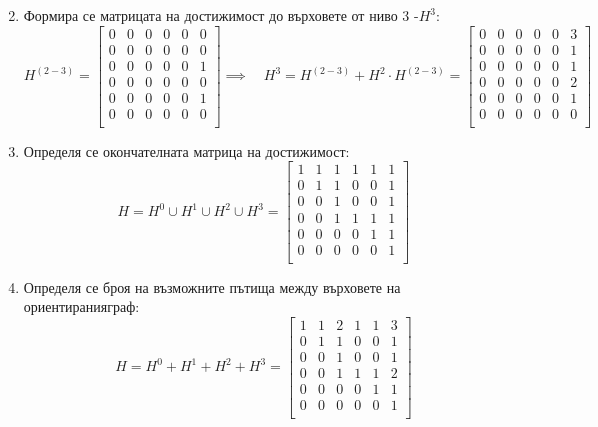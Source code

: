 \documentclass[fleqn, 12pt]{article}
\theoremstyle{definition}
\begin{document}
\begin{enumerate}
$$$$
\item Формира се матрицата на достижимост до върховете от ниво 3 -$H^3$:
$$
H^{(2-3)} = 
\begin{bmatrix}
0 & 0 & 0 & 0 & 0 & 0 \\
0 & 0 & 0 & 0 & 0 & 0 \\
0 & 0 & 0 & 0 & 0 & 1 \\
0 & 0 & 0 & 0 & 0 & 0 \\
0 & 0 & 0 & 0 & 0 & 1 \\
0 & 0 & 0 & 0 & 0 & 0  \\
\end{bmatrix}
\implies \quad 
H^3 = H^{(2-3)} + H^2 \cdot H^{(2-3)} = 
\begin{bmatrix}
0 & 0 & 0 & 0 & 0 & 3 \\
0 & 0 & 0 & 0 & 0 & 1 \\
0 & 0 & 0 & 0 & 0 & 1 \\
0 & 0 & 0 & 0 & 0 & 2 \\
0 & 0 & 0 & 0 & 0 & 1 \\
0 & 0 & 0 & 0 & 0 & 0  \\
\end{bmatrix}
$$
\item Определя се окончателната матрица на достижимост:
$$
H = H^0 \cup H^1 \cup H^2 \cup H^3 = 
\begin{bmatrix}
1 & 1 & 1 & 1 & 1 & 1 \\
0 & 1 & 1 & 0 & 0 & 1 \\
0 & 0 & 1 & 0 & 0 & 1 \\
0 & 0 & 1 & 1 & 1 & 1 \\
0 & 0 & 0 & 0 & 1 & 1 \\
0 & 0 & 0 & 0 & 0 & 1  \\
\end{bmatrix}
$$
\item Определя се броя на възможните пътища между върховете на ориентиранияграф:
$$
H = H^0 + H^1 + H^2 + H^3 = 
\begin{bmatrix}
1 & 1 & 2 & 1 & 1 & 3 \\
0 & 1 & 1 & 0 & 0 & 1 \\
0 & 0 & 1 & 0 & 0 & 1 \\
0 & 0 & 1 & 1 & 1 & 2 \\
0 & 0 & 0 & 0 & 1 & 1 \\
0 & 0 & 0 & 0 & 0 & 1  \\
\end{bmatrix}
$$
\end{enumerate}

\newpage
\end{document}
